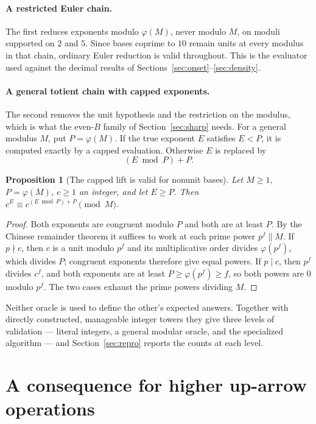\documentclass[11pt,letterpaper]{article}
\numberwithin{equation}{section}
\newtheorem{proposition}[theorem]{Proposition}
\theoremstyle{definition}
\theoremstyle{remark}
\begin{document}
\paragraph{A restricted Euler chain.} The first reduces exponents modulo $\varphi(M)$, never modulo $M$, on moduli supported on $2$ and $5$. Since bases coprime to $10$ remain units at every modulus in that chain, ordinary Euler reduction is valid throughout. This is the evaluator used against the decimal results of Sections~\ref{sec:onset}--\ref{sec:density}.

\paragraph{A general totient chain with capped exponents.} The second removes the unit hypothesis and the restriction on the modulus, which is what the even-$B$ family of Section~\ref{sec:sharp} needs. For a general modulus $M$, put $P=\varphi(M)$. If the true exponent $E$ satisfies $E<P$, it is computed exactly by a capped evaluation. Otherwise $E$ is replaced by
\begin{equation}\label{eq:totient-lift}
 (E\bmod P)+P .
\end{equation}

\begin{proposition}[The capped lift is valid for nonunit bases]\label{prop:oracle}
Let $M\ge1$, $P=\varphi(M)$, $c\ge1$ an integer, and let $E\ge P$. Then $c^E\equiv c^{(E\bmod P)+P}\pmod M$.
\end{proposition}
\begin{proof}
Both exponents are congruent modulo $P$ and both are at least $P$. By the Chinese remainder theorem it suffices to work at each prime power $p^f\parallel M$. If $p\nmid c$, then $c$ is a unit modulo $p^f$ and its multiplicative order divides $\varphi(p^f)$, which divides $P$; congruent exponents therefore give equal powers. If $p\mid c$, then $p^f$ divides $c^{f}$, and both exponents are at least $P\ge\varphi(p^f)\ge f$, so both powers are $0$ modulo $p^f$. The two cases exhaust the prime powers dividing $M$.
\end{proof}

Neither oracle is used to define the other's expected answers. Together with directly constructed, manageable integer towers they give three levels of validation --- literal integers, a general modular oracle, and the specialized algorithm --- and Section~\ref{sec:repro} reports the counts at each level.

\section{A consequence for higher up-arrow operations}\label{sec:arrows}
\end{document}
